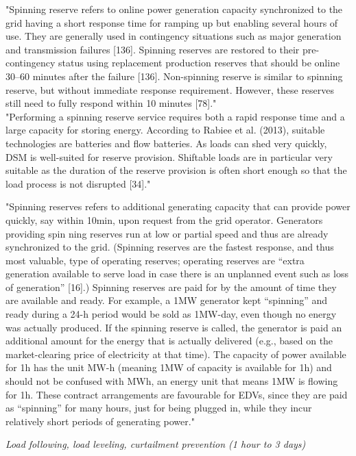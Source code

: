 "Spinning reserve refers to online power generation capacity synchronized to the grid having a short response time for ramping up but enabling several hours of use. They are generally used in contingency situations such as major generation and transmission failures [136]. Spinning reserves are restored to their pre-contingency status using replacement production reserves that should be online 30–60 minutes after the failure [136]. Non-spinning reserve is similar to spinning reserve, but without immediate response requirement. However, these reserves still need to fully respond within 10 minutes [78]." \\
"Performing a spinning reserve service requires both a rapid response time and a large capacity for storing energy. According to Rabiee et al. (2013), suitable technologies are batteries and flow batteries. As loads can shed very quickly, DSM is well-suited for reserve provision. Shiftable loads are in particular very suitable as the duration of the reserve provision is often short enough so that the load process is not disrupted [34]." \cite{lund_review_2015}

"Spinning reserves refers to additional generating capacity that can provide power quickly, say within 10min, upon request from the grid operator. Generators providing spin ning reserves run at low or partial speed and thus are already synchronized to the grid. (Spinning reserves are the fastest response, and thus most valuable, type of operating reserves; operating reserves are “extra generation available to serve load in case there is an unplanned event such as loss of generation” [16].) Spinning reserves are paid for by the amount of time they are available and ready. For example, a 1MW generator kept “spinning” and ready during a 24-h period would be sold as 1MW-day, even though no energy was actually produced. If the spinning reserve is called, the generator is paid an additional amount for the energy that is actually delivered (e.g., based on the market-clearing price of electricity at that time). The capacity of power available for 1h has the unit MW-h (meaning 1MW of capacity is available for 1h) and should not be confused with MWh, an energy unit that means 1MW is flowing for 1h. These contract arrangements are favourable for EDVs, since they are paid as “spinning” for many hours, just for being plugged in, while they incur relatively short periods of generating power." \cite{kempton_vehicle--grid_2005}




\emph{Load following, load leveling, curtailment prevention (1 hour to 3 days)}

